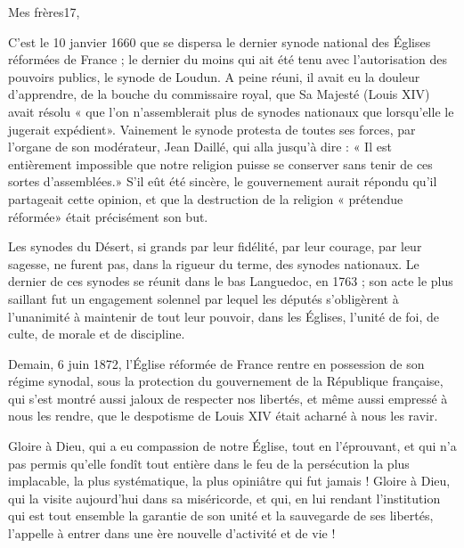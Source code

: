 

Mes frères17,

C’est le 10 janvier 1660 que se dispersa le dernier synode national des Églises réformées de France ; le dernier du moins qui ait été tenu avec l’autorisation des pouvoirs publics, le synode de Loudun. A peine réuni, il avait eu la douleur d’apprendre, de la bouche du commissaire royal, que Sa Majesté (Louis XIV) avait résolu « que l’on n’assemblerait plus de synodes nationaux que lorsqu’elle le jugerait expédient». Vainement le synode protesta de toutes ses forces, par l’organe de son modérateur, Jean Daillé, qui alla jusqu’à dire : « Il est entièrement impossible que notre religion puisse se conserver sans tenir de ces sortes d’assemblées.» S’il eût été sincère, le gouvernement aurait répondu qu’il partageait cette opinion, et que la destruction de la religion « prétendue réformée» était précisément son but.

Les synodes du Désert, si grands par leur fidélité, par leur courage, par leur sagesse, ne furent pas, dans la rigueur du terme, des synodes nationaux. Le dernier de ces synodes se réunit dans le bas Languedoc, en 1763 ; son acte le plus saillant fut un engagement solennel par lequel les députés s’obligèrent à l’unanimité à maintenir de tout leur pouvoir, dans les Églises, l’unité de foi, de culte, de morale et de discipline.

Demain, 6 juin 1872, l’Église réformée de France rentre en possession de son régime synodal, sous la protection du gouvernement de la République française, qui s’est montré aussi jaloux de respecter nos libertés, et même aussi empressé à nous les rendre, que le despotisme de Louis XIV était acharné à nous les ravir.

Gloire à Dieu, qui a eu compassion de notre Église, tout en l’éprouvant, et qui n’a pas permis qu’elle fondît tout entière dans le feu de la persécution la plus implacable, la plus systématique, la plus opiniâtre qui fut jamais ! Gloire à Dieu, qui la visite aujourd’hui dans sa miséricorde, et qui, en lui rendant l’institution qui est tout ensemble la garantie de son unité et la sauvegarde de ses libertés, l’appelle à entrer dans une ère nouvelle d’activité et de vie !

